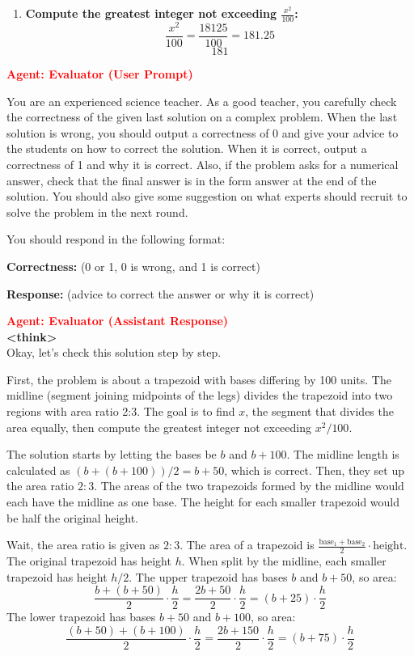 \begin{tcolorbox}[
  title=Multiagent Collaborative Reasoning Trace Data Sample,
  breakable,
  colback=white,
  colframe=black
]
\begin{enumerate}
  \item \textbf{Compute the greatest integer not exceeding \( \frac{x^2}{100} \):}
  \[
  \frac{x^2}{100} = \frac{18125}{100} = 181.25
  \]
  \[
  \boxed{181}
  \]
\end{enumerate}

\textcolor{red}{\textbf{Agent: Evaluator (User Prompt)}}

You are an experienced science teacher. As a good teacher, you carefully check the correctness of the given last solution on a complex problem. When the last solution is wrong, you should output a correctness of 0 and give your advice to the students on how to correct the solution. When it is correct, output a correctness of 1 and why it is correct. Also, if the problem asks for a numerical answer, check that the final answer is in the form \( \boxed{\text{answer}} \) at the end of the solution. You should also give some suggestion on what experts should recruit to solve the problem in the next round.

You should respond in the following format:

\textbf{Correctness:} (0 or 1, 0 is wrong, and 1 is correct)

\textbf{Response:} (advice to correct the answer or why it is correct)

\textcolor{red}{\textbf{Agent: Evaluator (Assistant Response)}} \\
\textbf{\textless think\textgreater}  \\
Okay, let's check this solution step by step.

First, the problem is about a trapezoid with bases differing by 100 units. The midline (segment joining midpoints of the legs) divides the trapezoid into two regions with area ratio 2:3. The goal is to find \( x \), the segment that divides the area equally, then compute the greatest integer not exceeding \( x^2/100 \).

The solution starts by letting the bases be \( b \) and \( b+100 \). The midline length is calculated as \( (b + (b+100))/2 = b + 50 \), which is correct. Then, they set up the area ratio \( 2:3 \). The areas of the two trapezoids formed by the midline would each have the midline as one base. The height for each smaller trapezoid would be half the original height.

Wait, the area ratio is given as \( 2:3 \). The area of a trapezoid is \( \frac{\text{base}_1 + \text{base}_2}{2} \cdot \text{height} \). The original trapezoid has height \( h \). When split by the midline, each smaller trapezoid has height \( h/2 \). The upper trapezoid has bases \( b \) and \( b + 50 \), so area:
\[
\frac{b + (b + 50)}{2} \cdot \frac{h}{2} = \frac{2b + 50}{2} \cdot \frac{h}{2} = (b + 25) \cdot \frac{h}{2}
\]
The lower trapezoid has bases \( b + 50 \) and \( b + 100 \), so area:
\[
\frac{(b + 50) + (b + 100)}{2} \cdot \frac{h}{2} = \frac{2b + 150}{2} \cdot \frac{h}{2} = (b + 75) \cdot \frac{h}{2}
\]


\end{tcolorbox}
